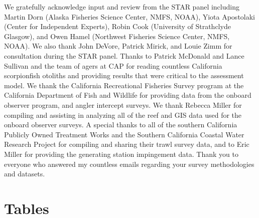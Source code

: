 \documentclass[12pt,]{article}
\begin{document}
We gratefully acknowledge input and review from the STAR panel including
Martin Dorn (Alaska Fisheries Science Center, NMFS, NOAA), Yiota
Apostolaki (Center for Independent Experts), Robin Cook (University of
Strathclyde Glasgow), and Owen Hamel (Northwest Fisheries Science
Center, NMFS, NOAA). We also thank John DeVore, Patrick Mirick, and
Louie Zimm for consultation during the STAR panel. Thanks to Patrick
McDonald and Lance Sullivan and the team of agers at CAP for reading
countless California scorpionfish otoliths and providing results that
were critical to the assessment model. We thank the California
Recreational Fisheries Survey program at the California Department of
Fish and Wildlife for providing data from the onboard observer program,
and angler intercept surveys. We thank Rebecca Miller for compiling and
assisting in analyzing all of the reef and GIS data used for the onboard
observer surveys. A special thanks to all of the southern California
Publicly Owned Treatment Works and the Southern California Coastal Water
Research Project for compiling and sharing their trawl survey data, and
to Eric Miller for providing the generating station impingement data.
Thank you to everyone who answered my countless emails regarding your
survey methodologies and datasets.

\newpage

\FloatBarrier

\section{Tables}\label{tables}

\FloatBarrier
\end{document}
